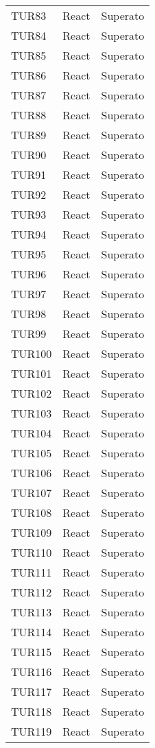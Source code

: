 \documentclass[PianoDiQualifica.tex]{subfiles}
\begin{document}
\begin{longtable}[H]{P{2cm}P{8.5cm}P{3cm}}
	TUR83 & React & Superato \\ 
	TUR84 & React & Superato \\ 
	TUR85 & React & Superato \\ 
	TUR86 & React & Superato \\ 
	TUR87 & React & Superato \\ 
	TUR88 & React & Superato \\ 
	TUR89 & React & Superato \\ 
	TUR90 & React & Superato \\ 
	TUR91 & React & Superato \\ 
	TUR92 & React & Superato \\ 
	TUR93 & React & Superato \\ 
	TUR94 & React & Superato \\ 
	TUR95 & React & Superato \\ 
	TUR96 & React & Superato \\ 
	TUR97 & React & Superato \\ 
	TUR98 & React & Superato \\ 
	TUR99 & React & Superato \\ 
	TUR100 & React & Superato \\ 
	TUR101 & React & Superato \\ 
	TUR102 & React & Superato \\ 
	TUR103 & React & Superato \\ 
	TUR104 & React & Superato \\ 
	TUR105 & React & Superato \\ 
	TUR106 & React & Superato \\ 
	TUR107 & React & Superato \\ 
	TUR108 & React & Superato \\ 
	TUR109 & React & Superato \\ 
	TUR110 & React & Superato \\ 
	TUR111 & React & Superato \\ 
	TUR112 & React & Superato \\ 
	TUR113 & React & Superato \\ 
	TUR114 & React & Superato \\ 
	TUR115 & React & Superato \\ 
	TUR116 & React & Superato \\ 
	TUR117 & React & Superato \\ 
	TUR118 & React & Superato \\ 
	TUR119 & React & Superato \\ 

\end{longtable}
\end{document}
